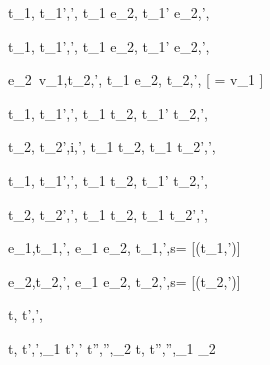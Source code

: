   {t_1,\sigma {} t_1',\sigma',\phi}
  {t_1 \Then e_2,\sigma {} t_1' \Then e_2,\sigma',\phi}

  {t_1,\sigma {} t_1',\sigma',\phi}
  {t_1 \Next e_2,\sigma {} t_1' \Next e_2,\sigma',\phi}

  {e_2\ v_1,\sigma \normalise t_2,\sigma',\phi}
  {t_1 \Next e_2,\sigma \handle{\Continue} t_2,\sigma',\phi}
  [ = v_1 \land \neg{}]


  {t_1,\sigma {} t_1',\sigma',\phi}
  {t_1 \And t_2,\sigma {} t_1' \And t_2,\sigma',\phi}

  {t_2,\sigma {} t_2',i,\sigma',\phi}
  {t_1 \And t_2,\sigma {} t_1 \And t_2',\sigma',\phi}


  {t_1,\sigma {} t_1',\sigma',\phi}
  {t_1 \Or t_2,\sigma {} t_1' \Or t_2,\sigma',\phi}

  {t_2,\sigma {} t_2',\sigma',\phi }
  {t_1 \Or t_2,\sigma {} t_1 \Or t_2',\sigma',\phi}


  {e_1,\sigma \normalise t_1,\sigma',\phi}
  {e_1 \Xor e_2,\sigma {} t_1,\sigma',\phi\land s=\Left}
  [\neg\Failing(t_1,\sigma')]

  {e_2,\sigma \normalise t_2,\sigma',\phi}
  {e_1 \Xor e_2,\sigma {} t_2,\sigma',\phi\land s=\Right}
  [\neg\Failing(t_2,\sigma')]





  {t,\sigma {} t',\sigma',\phi}


  {t,\sigma {} t',\sigma',\phi_1 \Quad
   t',\sigma' \normalise t'',\sigma'',\phi_2}
  {t,\sigma {} t'',\sigma'',\phi_1 \land \phi_2}
